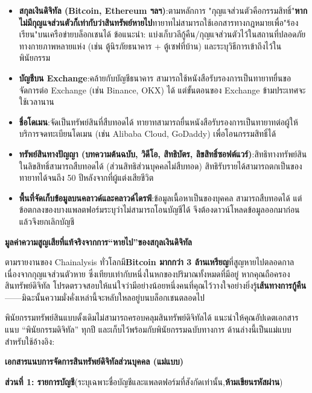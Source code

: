 \begin{itemize}
  \item \textbf{สกุลเงินดิจิทัล (Bitcoin, Ethereum ฯลฯ)}:ตามหลักการ "กุญแจส่วนตัวคือกรรมสิทธิ์"\textbf{หากไม่มีกุญแจส่วนตัวก็เท่ากับว่าสินทรัพย์หายไป}ทายาทไม่สามารถใช้เอกสารทางกฎหมายเพื่อ"ร้องเรียน"บนเครือข่ายบล็อกเชนได้ ข้อแนะนำ: แบ่งเก็บวลีกู้คืน/กุญแจส่วนตัวไว้ในสถานที่ปลอดภัยทางกายภาพหลายแห่ง (เช่น ตู้นิรภัยธนาคาร + ตู้เซฟที่บ้าน) และระบุวิธีการเข้าถึงไว้ในพินัยกรรม
  \item \textbf{บัญชีบน Exchange}:คล้ายกับบัญชีธนาคาร สามารถใช้หนังสือรับรองการเป็นทายาทยื่นขอจัดการต่อ Exchange (เช่น Binance, OKX) ได้ แต่ขั้นตอนของ Exchange ข้ามประเทศจะใช้เวลานาน
  \item \textbf{ชื่อโดเมน}:จัดเป็นทรัพย์สินที่สืบทอดได้ ทายาทสามารถยื่นหนังสือรับรองการเป็นทายาทต่อผู้ให้บริการจดทะเบียนโดเมน (เช่น Alibaba Cloud, GoDaddy) เพื่อโอนกรรมสิทธิ์ได้
  \item \textbf{ทรัพย์สินทางปัญญา (บทความต้นฉบับ, วิดีโอ, สิทธิบัตร, ลิขสิทธิ์ซอฟต์แวร์)}:สิทธิทางทรัพย์สินในลิขสิทธิ์สามารถสืบทอดได้ (ส่วนสิทธิส่วนบุคคลไม่สืบทอด) สิทธิรับรายได้สามารถตกเป็นของทายาทได้จนถึง 50 ปีหลังจากที่ผู้แต่งเสียชีวิต
  \item \textbf{พื้นที่จัดเก็บข้อมูลบนคลาวด์และคลาวด์ไดรฟ์}:ข้อมูลเนื้อหาเป็นของบุคคล สามารถสืบทอดได้ แต่ข้อตกลงของบางแพลตฟอร์มระบุว่าไม่สามารถโอนบัญชีได้ จึงต้องดาวน์โหลดข้อมูลออกมาก่อนแล้วจึงยกเลิกบัญชี
\end{itemize}

\textbf{มูลค่าความสูญเสียที่แท้จริงจากการ“หายไป”ของสกุลเงินดิจิทัล}\par

ตามรายงานของ Chainalysis ทั่วโลกมี\textbf{Bitcoin มากกว่า 3 ล้านเหรียญ}ที่สูญหายไปตลอดกาลเนื่องจากกุญแจส่วนตัวหาย ซึ่งเทียบเท่ากับหนึ่งในหกของปริมาณทั้งหมดที่มีอยู่ หากคุณถือครองสินทรัพย์ดิจิทัล โปรดตรวจสอบให้แน่ใจว่ามีอย่างน้อยหนึ่งคนที่คุณไว้วางใจอย่างยิ่งรู้\textbf{เส้นทางการกู้คืน}——มิฉะนั้นความมั่งคั่งเหล่านี้จะหลับใหลอยู่บนบล็อกเชนตลอดไป


พินัยกรรมทรัพย์สินแบบดั้งเดิมไม่สามารถครอบคลุมสินทรัพย์ดิจิทัลได้ แนะนำให้คุณอัปเดตเอกสารแนบ “พินัยกรรมดิจิทัล” ทุกปี และเก็บไว้พร้อมกับพินัยกรรมฉบับทางการ ด้านล่างนี้เป็นแม่แบบสำหรับใช้อ้างอิง:

\textbf{เอกสารแนบการจัดการสินทรัพย์ดิจิทัลส่วนบุคคล (แม่แบบ)}\par

\textbf{ส่วนที่ 1: รายการบัญชี}(ระบุเฉพาะชื่อบัญชีและแพลตฟอร์มที่สังกัดเท่านั้น,\textbf{ห้ามเขียนรหัสผ่าน})

